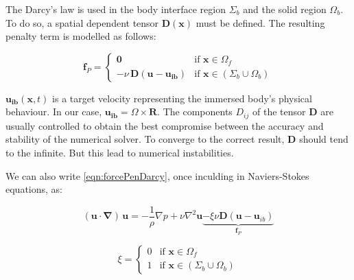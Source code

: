 The Darcy's law is used in the body interface region $\Sigma_b$ and the solid region $\Omega_b$. To do so, a spatial dependent tensor $\boldsymbol{D}(\boldsymbol{x})$ must be defined. The resulting penalty term is modelled as follows:

\begin{equation}
     \boldsymbol{f}_P = \left\{
        \begin{array}{ll}
        \boldsymbol{0} & \textrm{if } \boldsymbol{x} \in \Omega_f \\
        -\nu \, \boldsymbol{D} \left(\boldsymbol{u} - \boldsymbol{u_{ib}} \right) & \textrm{if } \boldsymbol{x} \in (\Sigma_b \cup \Omega_b)
        \end{array} \right.
    \label{eqn:forcePenDarcy}
\end{equation}

$\boldsymbol{u_{ib}}(\boldsymbol{x}, t)$ is a target velocity representing the immersed body's physical behaviour. In our case, $\boldsymbol{u_{ib}} = \Omega \times \boldsymbol{R}$. The components $D_{ij}$ of the tensor $\boldsymbol{D}$ are usually controlled to obtain the best compromise between the accuracy and stability of the numerical solver.
To converge to the correct result, $\mathbf{D}$ should tend to the infinite. But this lead to numerical instabilities. %

We can also write \autoref{eqn:forcePenDarcy}, once inculding in Naviers-Stokes equations, as:

\begin{equation}
    \label{eq:IBM}
    (\boldsymbol{u} \cdot \boldsymbol{\nabla})\, \boldsymbol{u} = 
    -\frac{1}{\rho} \nabla p + \nu \nabla^2 \boldsymbol{u} 
    \underbrace{- \xi \nu \boldsymbol{D} \left( \boldsymbol{u} - \boldsymbol{u}_{ib} \right)}_{\boldsymbol{f}_P}
\end{equation}

\begin{equation}
    \label{eq:IBMBody}
    \xi = \left\{
   \begin{array}{ll}
   0 & \textrm{if } \boldsymbol{x} \in \Omega_f \\
   1 & \textrm{if } \boldsymbol{x} \in (\Sigma_b \cup \Omega_b)
   \end{array} \right.
\end{equation}

